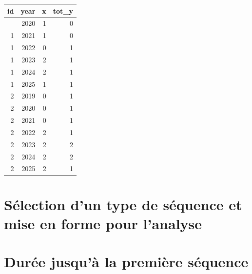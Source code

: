 \documentclass[
  12pt,
  letterpaper,
  DIV=11,
  numbers=noendperiod,
  onepage,
  openany]{scrreprt}
\begin{document}
\begin{longtable}[]{@{}rrrr@{}}
\toprule\noalign{}
id & year & x & tot\_y \\
\midrule\noalign{}
\endhead
\bottomrule\noalign{}
\endlastfoot
1 & 2020 & 1 & 0 \\
1 & 2021 & 1 & 0 \\
1 & 2022 & 0 & 1 \\
1 & 2023 & 2 & 1 \\
1 & 2024 & 2 & 1 \\
1 & 2025 & 1 & 1 \\
2 & 2019 & 0 & 1 \\
2 & 2020 & 0 & 1 \\
2 & 2021 & 0 & 1 \\
2 & 2022 & 2 & 1 \\
2 & 2023 & 2 & 2 \\
2 & 2024 & 2 & 2 \\
2 & 2025 & 2 & 1 \\
\end{longtable}

\hypertarget{suxe9lection-dun-type-de-suxe9quence-et-mise-en-forme-pour-lanalyse}{%
\section{Sélection d'un type de séquence et mise en forme pour
l'analyse}\label{suxe9lection-dun-type-de-suxe9quence-et-mise-en-forme-pour-lanalyse}}

\hypertarget{duruxe9e-jusquuxe0-la-premiuxe8re-suxe9quence}{%
\section{Durée jusqu'à la première
séquence}\label{duruxe9e-jusquuxe0-la-premiuxe8re-suxe9quence}}
\end{document}
